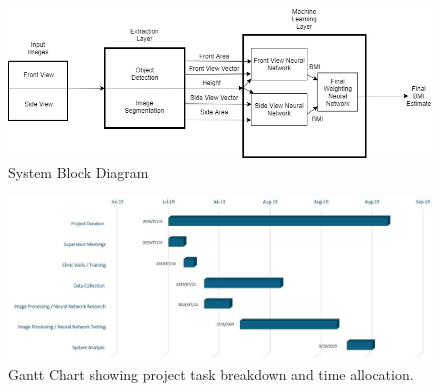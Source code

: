 \documentclass[conference]{IEEEtran}
\begin{document}
\begin{landscape}
\begin{figure}
    \centering
    \includegraphics[width=\linewidth]{systemblock.jpg}
    \caption{System Block Diagram}
    \label{fig:systemblockdiagram}
\end{figure}
\end{landscape}
\begin{landscape}
\begin{figure}
    \centering
    \includegraphics[width=\linewidth]{gannt.JPG}
    \caption{Gantt Chart showing project task breakdown and time allocation.}
    \label{fig:gantt}
\end{figure}
\end{landscape}
\end{document}
